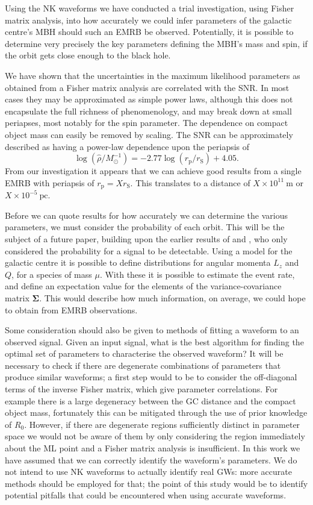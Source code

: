 \documentclass[useAMS,usedcolumn,usegraphicx,usenatbib]{mn2e}
\newcommand{\units}[1]{\ensuremath{~\mathrm{#1}}}
\newcommand{\sub}[1]{\ensuremath{_\mathrm{#1}}}
\begin{document}
Using the NK waveforms we have conducted a trial investigation, using Fisher matrix analysis, into how accurately we could infer parameters of the galactic centre's MBH should such an EMRB be observed. Potentially, it is possible to determine very precisely the key parameters defining the MBH's mass and spin, if the orbit gets close enough to the black hole. 

We have shown that the uncertainties in the maximum likelihood parameters as obtained from a Fisher matrix analysis are correlated with the SNR. In most cases they may be approximated as simple power laws, although this does not encapsulate the full richness of phenomenology, and may break down at small periapses, most notably for the spin parameter. The dependence on compact object mass can easily be removed by scaling. The SNR can be approximately described as having a power-law dependence upon the periapsis of
\begin{equation}
\log\left(\hat{\rho}/M_\odot^{-1}\right) = -2.77\log(r\sub{p}/r\sub{S}) + 4.05.
\end{equation}
From our investigation it appears that we can achieve good results from a single EMRB with periapsis of $r\sub{p} = X r\sub{S}$. This translates to a distance of $X \times 10^{11}\units{m}$ or $X \times 10^{-5}\units{pc}$.

Before we can quote results for how accurately we can determine the various parameters, we must consider the probability of each orbit. This will be the subject of a future paper, building upon the earlier results of \citet{Rubbo2006} and \citet{Hopman2007}, who only considered the probability for a signal to be detectable. Using a model for the galactic centre it is possible to define distributions for angular momenta $L_z$ and $Q$, for a species of mass $\mu$. With these it is possible to estimate the event rate, and define an expectation value for the elements of the variance-covariance matrix $\boldsymbol{\Sigma}$. This would describe how much information, on average, we could hope to obtain from EMRB observations.

Some consideration should also be given to methods of fitting a waveform to an observed signal. Given an input signal, what is the best algorithm for finding the optimal set of parameters to characterise the observed waveform? It will be necessary to check if there are degenerate combinations of parameters that produce similar waveforms; a first step would to be to consider the off-diagonal terms of the inverse Fisher matrix, which give parameter correlations. For example there is a large degeneracy between the GC distance and the compact object mass, fortunately this can be mitigated through the use of prior knowledge of $R_0$. However, if there are degenerate regions sufficiently distinct in parameter space we would not be aware of them by only considering the region immediately about the ML point and a Fisher matrix analysis is insufficient. In this work we have assumed that we can correctly identify the waveform's parameters. We do not intend to use NK waveforms to actually identify real GWs: more accurate methods should be employed for that; the point of this study would be to identify potential pitfalls that could be encountered when using accurate waveforms.
\end{document}
